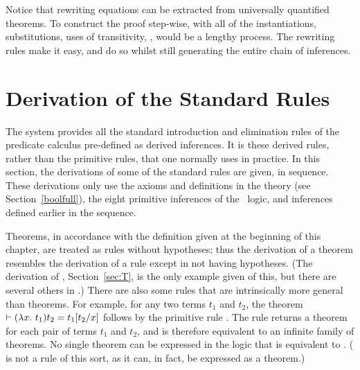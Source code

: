 \noindent Notice that rewriting
equations can be extracted from
universally quantified theorems.
To construct the
proof step-wise, with all of the instantiations,
substitutions, uses of transitivity, \etc,
would be a lengthy process. The rewriting rules make it easy,
and do so whilst still generating the entire chain of inferences.

\section{Derivation of the Standard Rules}
\label{sec:standard-rule-derivation}

%
The \HOL{} system provides all the standard introduction and
elimination rules of the predicate calculus pre-defined as derived
inferences.  It is these derived rules, rather than the primitive
rules, that one normally uses in practice.  In this section, the
derivations of some of the standard rules are given, in sequence.
These derivations only use the axioms and definitions in the theory
 (see Section~\ref{boolfull}), the eight primitive
inferences of the \HOL\ logic, and inferences defined earlier in the
sequence.

Theorems,
%
%
%
in accordance with the definition given at the beginning of this
chapter, are treated as rules without hypotheses; thus the derivation
of a theorem resembles the derivation of a rule except in not having
hypotheses. (The derivation of , Section~\ref{sec:T}, is
the only example given of this, but there are several others in \HOL.)
There are also some rules that are intrinsically more general than
theorems.  For example, for any two terms $t_1$ and $t_2$, the theorem
$\vdash(\lambda x.\ t_1)t_2 = t_1[t_2/x]$ follows by the primitive rule
. The rule  returns a theorem for each
pair of terms $t_1$ and $t_2$, and is therefore equivalent to an
infinite family
%
%
%
of theorems. No single theorem can be expressed in the \HOL{} logic
that is equivalent to .%
%
%
( is not a rule of this sort, as it can, in fact, be
expressed as a theorem.)

